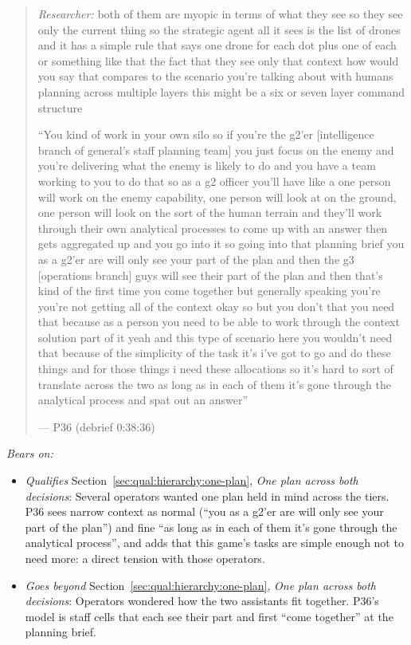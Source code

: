 \begin{quote}\small
{\footnotesize\textit{Researcher:} both of them are myopic in terms of what they see so they see only the current thing so the strategic agent all it sees is the list of drones and it has a simple rule that says one drone for each dot plus one of each or something like that the fact that they see only that context how would you say that compares to the scenario you're talking about with humans planning across multiple layers this might be a six or seven layer command structure}\par\smallskip
``You kind of work in your own silo so if you're the g2'er [intelligence branch of general's staff planning team] you just focus on the enemy and you're delivering what the enemy is likely to do and you have a team working to you to do that so as a g2 officer you'll have like a one person will work on the enemy capability, one person will look at on the ground, one person will look on the sort of the human terrain and they'll work through their own analytical processes to come up with an answer then gets aggregated up and you go into it so going into that planning brief you as a g2'er are will only see your part of the plan and then the g3 [operations branch] guys will see their part of the plan and then that's kind of the first time you come together but generally speaking you're you're not getting all of the context okay so but you don't that you need that because as a person you need to be able to work through the context solution part of it yeah and this type of scenario here you wouldn't need that because of the simplicity of the task it's i've got to go and do these things and for those things i need these allocations so it's hard to sort of translate across the two as long as in each of them it's gone through the analytical process and spat out an answer''\par\hfill--- P36 (debrief 0:38:36)
\end{quote}

\noindent\textit{Bears on:}
\begin{itemize}[leftmargin=1.2em,itemsep=1pt]\small
\item \textit{Qualifies} Section~\ref{sec:qual:hierarchy:one-plan}, \emph{One plan across both decisions}: Several operators wanted one plan held in mind across the tiers. P36 sees narrow context as normal (``you as a g2'er are will only see your part of the plan'') and fine ``as long as in each of them it's gone through the analytical process'', and adds that this game's tasks are simple enough not to need more: a direct tension with those operators.
\item \textit{Goes beyond} Section~\ref{sec:qual:hierarchy:one-plan}, \emph{One plan across both decisions}: Operators wondered how the two assistants fit together. P36's model is staff cells that each see their part and first ``come together'' at the planning brief.
\end{itemize}

